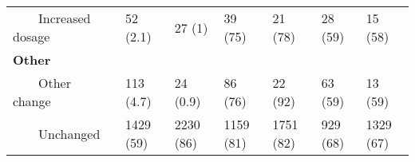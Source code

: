 \begin{table}[]
\begin{tabular}{lllllll}
~~~~Increased dosage       & 52 (2.1)                                        & 27 (1)                                   & 39 (75)                                            & 21 (78)                                    & 28 (59)                                          & 15 (58)                                   \\
\textbf{Other}                     &                                                 &                                          &                                                    &                                            &                                                  &                                           \\
~~~~Other change           & 113 (4.7)                                       & 24 (0.9)                                 & 86 (76)                                            & 22 (92)                                    & 63 (59)                                          & 13 (59)                                   \\
~~~~Unchanged              & 1429 (59)                                       & 2230 (86)                                & 1159 (81)                                          & 1751 (82)                                  & 929 (68)                                         & 1329 (67)                                
\end{tabular}
\end{table}